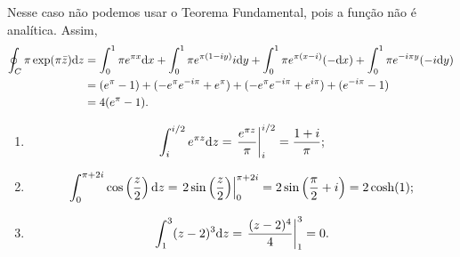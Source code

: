 \begin{questions}
\begin{solution}
    Nesse caso não podemos usar o Teorema Fundamental, pois a função não é analítica. Assim,
\begin{align*}
    \oint_C \pi \exp(\pi \bar z) \mathrm{d} z
        &= \int_0^1 \pi e^{\pi x} \mathrm{d} x + \int_0^1 \pi e^{\pi(1-iy)} i \mathrm{d} y + \int_0^1 \pi e^{\pi(x-i)} (-\mathrm{d} x) + \int_0^1 \pi e^{-i \pi y} (-i \mathrm{d} y) \\
        &= (e^\pi - 1) + (-e^\pi e^{-i\pi} + e^\pi) + (-e^\pi e^{-i\pi} + e^{i\pi}) + (e^{-i\pi} - 1) \\
        &= 4 (e^\pi - 1).
\end{align*}
    
\end{solution}


\begin{solution}
\begin{enumerate}[label=(\alph*)]
  \item
  \[
    \int_i^{i/2} e^{\pi z} \mathrm{d} z
        = \left.\frac{e^{\pi z}}{\pi}\right|_i^{i/2}
        = \frac{1 + i}{\pi};
  \]
  \item
  \[
    \int_0^{\pi + 2i} \cos\left( \frac{z}{2} \right) \mathrm{d} z
        = \left. 2 \sin\left( \frac{z}{2} \right) \right|_0^{\pi + 2i}
        = 2 \sin\left( \frac{\pi}{2} + i \right)
        = 2 \cosh(1);
  \]
  \item
  \[
    \int_1^3 (z-2)^3 \mathrm{d} z
        = \left. \frac{(z-2)^4}{4} \right|_1^3
        = 0.
  \]
\end{enumerate}
\end{solution}


\end{questions}
